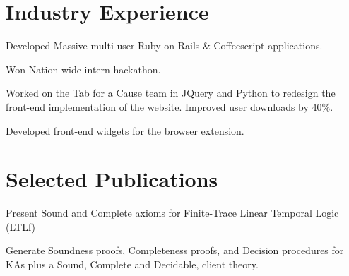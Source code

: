 \documentclass[]{deedy-resume-openfont}
\begin{document}
\begin{minipage}[t]{0.66\textwidth} 


\section{Industry Experience}

\vspace{\topsep} %
\begin{tightemize}
  \item Developed Massive multi-user Ruby on Rails \& Coffeescript applications.
  \item Won Nation-wide intern hackathon.
\end{tightemize}
\sectionsep

\begin{tightemize}
\item Worked on the Tab for a Cause team in JQuery and Python to redesign the front-end implementation of the website. Improved user downloads by 40\%.
\item Developed front-end widgets for the browser extension.\end{tightemize}


\section{Selected Publications}

Present Sound and Complete axioms for Finite-Trace Linear Temporal Logic (LTLf)
\sectionsep

Generate Soundness proofs, Completeness proofs, and Decision procedures for KAs plus a Sound, Complete and Decidable, client theory.
\sectionsep


\end{minipage}
\end{document}
